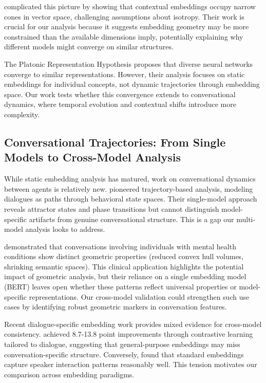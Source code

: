 \documentclass[11pt,letterpaper]{article}
\begin{document}
\citet{ethayarajh2019contextual} complicated this picture by showing that contextual embeddings occupy narrow cones in vector space, challenging assumptions about isotropy. Their work is crucial for our analysis because it suggests embedding geometry may be more constrained than the available dimensions imply, potentially explaining why different models might converge on similar structures.

The Platonic Representation Hypothesis \citep{huh2024platonic} proposes that diverse neural networks converge to similar representations. However, their analysis focuses on static embeddings for individual concepts, not dynamic trajectories through embedding space. Our work tests whether this convergence extends to conversational dynamics, where temporal evolution and contextual shifts introduce more complexity.

\subsection{Conversational Trajectories: From Single Models to Cross-Model Analysis}

While static embedding analysis has matured, work on conversational dynamics between agents is relatively new. \citet{brinberg2024dynamic} pioneered trajectory-based analysis, modeling dialogues as paths through behavioral state spaces. Their single-model approach reveals attractor states and phase transitions but cannot distinguish model-specific artifacts from genuine conversational structure. This is a gap our multi-model analysis looks to address.

\citet{palominos2024trajectories} demonstrated that conversations involving individuals with mental health conditions show distinct geometric properties (reduced convex hull volumes, shrinking semantic spaces). This clinical application highlights the potential impact of geometric analysis, but their reliance on a single embedding model (BERT) leaves open whether these patterns reflect universal properties or model-specific representations. Our cross-model validation could strengthen such use cases by identifying robust geometric markers in conversation features.

Recent dialogue-specific embedding work provides mixed evidence for cross-model consistency. \citet{dialoguecse2021} achieved 8.7-13.8 point improvements through contrastive learning tailored to dialogue, suggesting that general-purpose embeddings may miss conversation-specific structure. Conversely, \citet{dial2vec2022} found that standard embeddings capture speaker interaction patterns reasonably well. This tension motivates our comparison across embedding paradigms.
\end{document}
